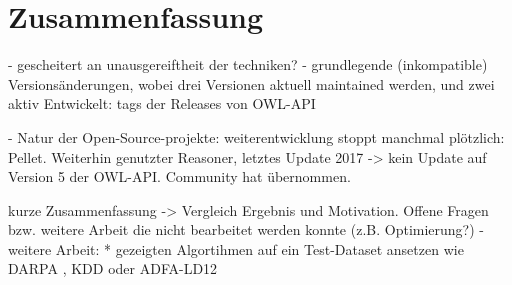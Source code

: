 \chapter{Zusammenfassung}
- gescheitert an unausgereiftheit der techniken?
- grundlegende (inkompatible) Versionsänderungen, wobei drei Versionen aktuell maintained werden, und zwei aktiv Entwickelt: tags der Releases von OWL-API

- Natur der Open-Source-projekte: weiterentwicklung stoppt manchmal plötzlich: Pellet. Weiterhin genutzter Reasoner, letztes Update 2017 -> kein Update auf Version 5 der OWL-API. Community hat übernommen.

kurze Zusammenfassung -> Vergleich Ergebnis und Motivation. Offene Fragen bzw. weitere Arbeit die nicht bearbeitet werden konnte (z.B. Optimierung?)
-weitere Arbeit:
	* gezeigten Algortihmen auf ein Test-Dataset ansetzen wie DARPA \cite{darpa99},  KDD \cite{kdd99} oder ADFA-LD12 \cite{adfald}